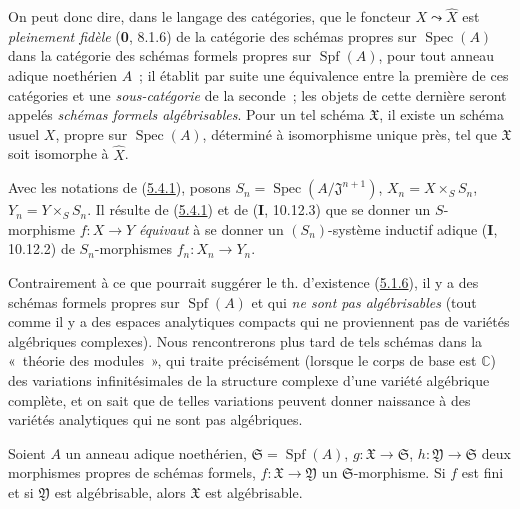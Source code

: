 On peut donc dire, dans le langage des catégories, que le foncteur
$X\leadsto\widehat X$ est \emph{pleinement fidèle} (\textbf{0}, 8.1.6) de la catégorie des
schémas propres sur $\operatorname{Spec}(A)$ dans la catégorie des schémas formels
propres sur $\operatorname{Spf}(A)$, pour tout anneau adique noethérien $A$~; il
établit par suite une équivalence entre la première de ces catégories et une
\emph{sous-catégorie} de la seconde~; les objets de cette dernière seront appelés
\emph{schémas formels algébrisables}. Pour un tel schéma $\mathfrak X$, il existe
un schéma usuel $X$, propre sur $\operatorname{Spec}(A)$, déterminé à isomorphisme
unique près, tel que $\mathfrak X$ soit isomorphe à $\widehat X$.

\begin{scholium}[5.4.2]
\label{III.5.4.2-fr}
Avec les notations de (\hyperref[III.5.4.1-fr]{5.4.1}), posons
$S_n=\operatorname{Spec}(A/\mathfrak J^{n+1})$,
$X_n=X\times_S S_n$, $Y_n=Y\times_S S_n$. Il résulte de
(\hyperref[III.5.4.1-fr]{5.4.1}) et de (\textbf{I}, 10.12.3) que se donner un
$S$-morphisme $f:X\to Y$ \emph{équivaut} à se donner un $(S_n)$-système inductif adique
(\textbf{I}, 10.12.2) de $S_n$-morphismes $f_n:X_n\to Y_n$.
\end{scholium}

\begin{remark}[5.4.3]
\label{III.5.4.3-fr}
Contrairement à ce que pourrait suggérer le th. d'existence
(\hyperref[III.5.1.6-fr]{5.1.6}), il y a des schémas formels propres sur
$\operatorname{Spf}(A)$ et qui \emph{ne sont pas algébrisables} (tout comme il y a des
espaces analytiques compacts qui ne proviennent pas de variétés algébriques
complexes). Nous rencontrerons plus tard de tels schémas dans la «~théorie des
modules~», qui traite précisément (lorsque le corps de base est $\mathbb C$) des
variations infinitésimales de la structure complexe d'une variété algébrique
complète, et on sait que de telles variations peuvent donner naissance à des
variétés analytiques qui ne sont pas algébriques.
\end{remark}

\begin{proposition}[5.4.4]
\label{III.5.4.4-fr}
Soient $A$ un anneau adique noethérien, $\mathfrak S=\operatorname{Spf}(A)$,
$g:\mathfrak X\to\mathfrak S$, $h:\mathfrak Y\to\mathfrak S$ deux morphismes
propres de schémas formels, $f:\mathfrak X\to\mathfrak Y$ un
$\mathfrak S$-morphisme. Si $f$ est fini et si $\mathfrak Y$ est algébrisable,
alors $\mathfrak X$ est algébrisable.
\end{proposition}

